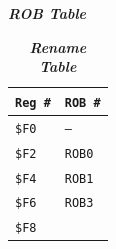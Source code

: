 \begin{enumerate}
\begin{table}[!htp]
\begin{adjustbox}{width={\textwidth},totalheight={\textheight},keepaspectratio}
        \end{adjustbox}
        \caption*{\emph{\textbf{ROB Table}}}
    \end{table}
    \begin{table}[!htp]
        \centering
        \begin{tabular}{@{} l l @{}}
            \toprule
            \texttt{Reg \#}  & \texttt{ROB \#} \\
            \midrule
            \texttt{\$F0}    & \texttt{--} \\ [.3em]
            \texttt{\$F2}    & \texttt{ROB0} \\ [.3em]
            \texttt{\$F4}    & \texttt{ROB1} \\ [.3em]
            \texttt{\$F6}    & \texttt{ROB3} \\ [.3em]
            \texttt{\$F8}    & \\
            \bottomrule
        \end{tabular}
        \caption*{\emph{\textbf{Rename Table}}}
    \end{table}


    \newpage



\end{enumerate}
